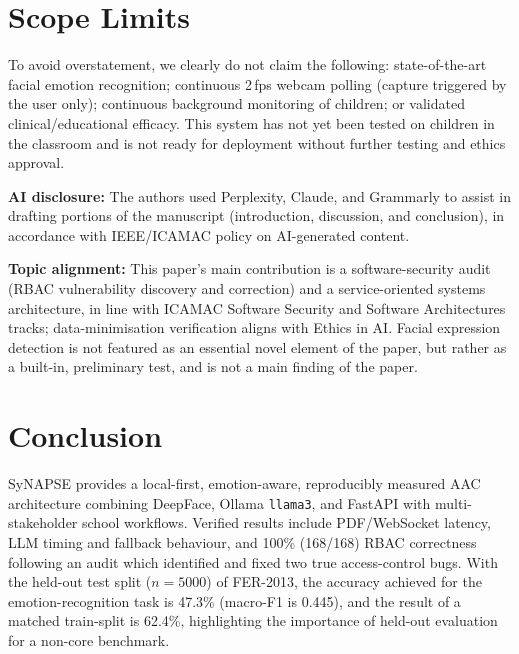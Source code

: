 \documentclass[conference]{IEEEtran}
\begin{document}
\section{Scope Limits}
To avoid overstatement, we clearly do not claim the following: state-of-the-art facial emotion recognition; continuous 2\,fps webcam polling (capture triggered by the user only); continuous background monitoring of children; or validated clinical/educational efficacy. This system has not yet been tested on children in the classroom and is not ready for deployment without further testing and ethics approval.

\textbf{AI disclosure:} The authors used Perplexity, Claude, and Grammarly to assist in drafting portions of the manuscript (introduction, discussion, and conclusion), in accordance with IEEE/ICAMAC policy on AI-generated content.

\textbf{Topic alignment:} This paper's main contribution is a software-security audit (RBAC vulnerability discovery and correction) and a service-oriented systems architecture, in line with ICAMAC Software Security and Software Architectures tracks; data-minimisation verification aligns with Ethics in AI. Facial expression detection is not featured as an essential novel element of the paper, but rather as a built-in, preliminary test, and is not a main finding of the paper.

\section{Conclusion}
SyNAPSE provides a local-first, emotion-aware, reproducibly measured AAC architecture combining DeepFace, Ollama \texttt{llama3}, and FastAPI with multi-stakeholder school workflows. Verified results include PDF/WebSocket latency, LLM timing and fallback behaviour, and 100\% (168/168) RBAC correctness following an audit which identified and fixed two true access-control bugs. With the held-out test split ($n{=}5000$) of FER-2013, the accuracy achieved for the emotion-recognition task is 47.3\% (macro-F1 is 0.445), and the result of a matched train-split is 62.4\%, highlighting the importance of held-out evaluation for a non-core benchmark.
\end{document}
